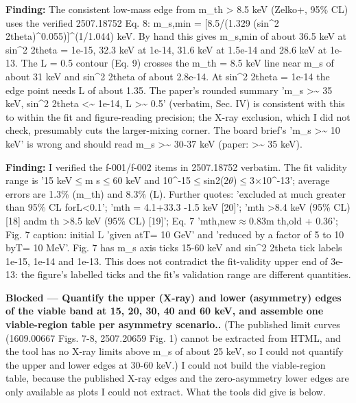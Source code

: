 \documentclass[11pt,a4paper]{article}
\begin{document}
\textbf{Finding:} The consistent low-mass edge from m\_th \textgreater{} 8.5 keV (Zelko+, 95\% CL) uses the verified 2507.18752 Eq. 8: m\_s,min = [8.5/(1.329 (sin\textasciicircum{}2 2theta)\textasciicircum{}0.055)]\textasciicircum{}(1/1.044) keV. By hand this gives m\_s,min of about 36.5 keV at sin\textasciicircum{}2 2theta = 1e-15, 32.3 keV at 1e-14, 31.6 keV at 1.5e-14 and 28.6 keV at 1e-13. The L = 0.5 contour (Eq. 9) crosses the m\_th = 8.5 keV line near m\_s of about 31 keV and sin\textasciicircum{}2 2theta of about 2.8e-14. At sin\textasciicircum{}2 2theta = 1e-14 the edge point needs L of about 1.35. The paper's rounded summary 'm\_s \textgreater{}\textasciitilde{} 35 keV, sin\textasciicircum{}2 2theta \textless{}\textasciitilde{} 1e-14, L \textgreater{}\textasciitilde{} 0.5' (verbatim, Sec. IV) is consistent with this to within the fit and figure-reading precision; the X-ray exclusion, which I did not check, presumably cuts the larger-mixing corner. The board brief's 'm\_s \textgreater{}\textasciitilde{} 10 keV' is wrong and should read m\_s \textgreater{}\textasciitilde{} 30-37 keV (paper: \textgreater{}\textasciitilde{} 35 keV).

\textbf{Finding:} I verified the f-001/f-002 items in 2507.18752 verbatim. The fit validity range is '15 keV$\leq$m s$\leq$60 keV and 10\textasciicircum{}-15$\leq$sin2(2$\theta$)$\leq$3$\times$10\textasciicircum{}-13'; average errors are 1.3\% (m\_th) and 8.3\% (L). Further quotes: 'excluded at much greater than 95\% CL forL\textless{}0.1'; 'mth = 4.1+33.3 -1.5 keV [20]'; 'mth \textgreater{}8.4 keV (95\% CL) [18] andm th \textgreater{}8.5 keV (95\% CL) [19]'; Eq. 7 'mth,new$\approx$0.83m th,old + 0.36'; Fig. 7 caption: initial L 'given atT= 10 GeV' and 'reduced by a factor of 5 to 10 byT= 10 MeV'. Fig. 7 has m\_s axis ticks 15-60 keV and sin\textasciicircum{}2 2theta tick labels 1e-15, 1e-14 and 1e-13. This does not contradict the fit-validity upper end of 3e-13: the figure's labelled ticks and the fit's validation range are different quantities.

\textbf{Blocked --- Quantify the upper (X-ray) and lower (asymmetry) edges of the viable band at 15, 20, 30, 40 and 60 keV, and assemble one viable-region table per asymmetry scenario..} (The published limit curves (1609.00667 Figs. 7-8, 2507.20659 Fig. 1) cannot be extracted from HTML, and the tool has no X-ray limits above m\_s of about 25 keV, so I could not quantify the upper and lower edges at 30-60 keV.) I could not build the viable-region table, because the published X-ray edges and the zero-asymmetry lower edges are only available as plots I could not extract. What the tools did give is below.
\end{document}
